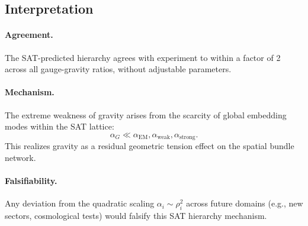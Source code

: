 \subsection{Interpretation}

\paragraph{Agreement.}
The SAT-predicted hierarchy agrees with experiment to within a factor of 2
across all gauge-gravity ratios, without adjustable parameters.

\paragraph{Mechanism.}
The extreme weakness of gravity arises from the scarcity of global
embedding modes within the SAT lattice:
\[
\alpha_G \ll \alpha_{\text{EM}},\alpha_{\text{weak}},\alpha_{\text{strong}}.
\]
This realizes gravity as a residual geometric tension effect on the spatial
bundle network.

\paragraph{Falsifiability.}
Any deviation from the quadratic scaling
$\alpha_i \sim \rho_i^2$ across future domains (e.g., new sectors, cosmological
tests) would falsify this SAT hierarchy mechanism.

